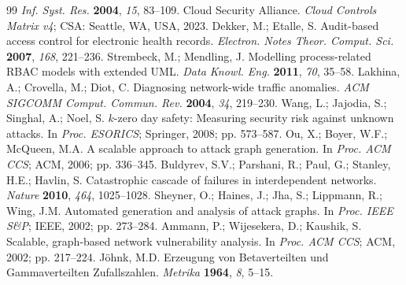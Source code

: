 \documentclass[conference]{IEEEtran}
\begin{document}
\begin{thebibliography}{99}
  \textit{Inf. Syst. Res.} \textbf{2004}, \textit{15}, 83--109.
  Cloud Security Alliance.
  \textit{Cloud Controls Matrix v4}; CSA: Seattle, WA, USA, 2023.
  Dekker, M.; Etalle, S.
  Audit-based access control for electronic health records.
  \textit{Electron. Notes Theor. Comput. Sci.} \textbf{2007}, \textit{168}, 221--236.
  Strembeck, M.; Mendling, J.
  Modelling process-related RBAC models with extended UML.
  \textit{Data Knowl. Eng.} \textbf{2011}, \textit{70}, 35--58.
  Lakhina, A.; Crovella, M.; Diot, C.
  Diagnosing network-wide traffic anomalies.
  \textit{ACM SIGCOMM Comput. Commun. Rev.} \textbf{2004}, \textit{34}, 219--230.
  Wang, L.; Jajodia, S.; Singhal, A.; Noel, S.
  $k$-zero day safety: Measuring security risk against unknown attacks.
  In \textit{Proc. ESORICS}; Springer, 2008; pp. 573--587.
  Ou, X.; Boyer, W.F.; McQueen, M.A.
  A scalable approach to attack graph generation.
  In \textit{Proc. ACM CCS}; ACM, 2006; pp. 336--345.
  Buldyrev, S.V.; Parshani, R.; Paul, G.; Stanley, H.E.; Havlin, S.
  Catastrophic cascade of failures in interdependent networks.
  \textit{Nature} \textbf{2010}, \textit{464}, 1025--1028.
  Sheyner, O.; Haines, J.; Jha, S.; Lippmann, R.; Wing, J.M.
  Automated generation and analysis of attack graphs.
  In \textit{Proc. IEEE S\&P}; IEEE, 2002; pp. 273--284.
  Ammann, P.; Wijesekera, D.; Kaushik, S.
  Scalable, graph-based network vulnerability analysis.
  In \textit{Proc. ACM CCS}; ACM, 2002; pp. 217--224.
  J{\"o}hnk, M.D.
  Erzeugung von Betaverteilten und Gammaverteilten Zufallszahlen.
  \textit{Metrika} \textbf{1964}, \textit{8}, 5--15.
\end{thebibliography}
\end{document}
